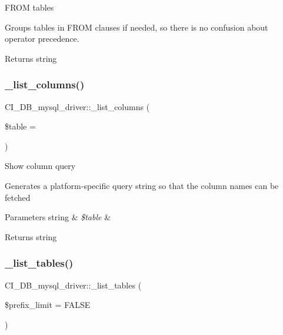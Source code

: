 F\+R\+OM tables

Groups tables in F\+R\+OM clauses if needed, so there is no confusion about operator precedence.

\begin{DoxyReturn}{Returns}
string 
\end{DoxyReturn}
\mbox{\label{class_c_i___d_b__mysql__driver_a71010e2a4cae5f018c1cbaa20a1878d3}} 
\subsubsection{\texorpdfstring{\+\_\+list\+\_\+columns()}{\_list\_columns()}}
{\footnotesize\ttfamily C\+I\+\_\+\+D\+B\+\_\+mysql\+\_\+driver\+::\+\_\+list\+\_\+columns (\begin{DoxyParamCaption}\item[{}]{\$table = {\ttfamily \textquotesingle{}\textquotesingle{}} }\end{DoxyParamCaption})\hspace{0.3cm}{\ttfamily [protected]}}

Show column query

Generates a platform-\/specific query string so that the column names can be fetched


\begin{DoxyParams}[1]{Parameters}
string & {\em \$table} & \\
\hline
\end{DoxyParams}
\begin{DoxyReturn}{Returns}
string 
\end{DoxyReturn}
\mbox{\label{class_c_i___d_b__mysql__driver_affa96317ec0ee6f0123e4f347d9c73f7}} 
\subsubsection{\texorpdfstring{\+\_\+list\+\_\+tables()}{\_list\_tables()}}
{\footnotesize\ttfamily C\+I\+\_\+\+D\+B\+\_\+mysql\+\_\+driver\+::\+\_\+list\+\_\+tables (\begin{DoxyParamCaption}\item[{}]{\$prefix\+\_\+limit = {\ttfamily FALSE} }\end{DoxyParamCaption})\hspace{0.3cm}{\ttfamily [protected]}}

